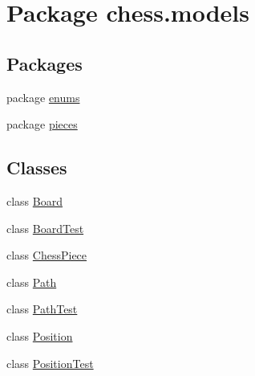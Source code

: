 \hypertarget{namespacechess_1_1models}{}\section{Package chess.\+models}
\label{namespacechess_1_1models}
\subsection*{Packages}
\begin{DoxyCompactItemize}
\item 
package \mbox{\hyperlink{namespacechess_1_1models_1_1enums}{enums}}
\item 
package \mbox{\hyperlink{namespacechess_1_1models_1_1pieces}{pieces}}
\end{DoxyCompactItemize}
\subsection*{Classes}
\begin{DoxyCompactItemize}
\item 
class \mbox{\hyperlink{classchess_1_1models_1_1_board}{Board}}
\item 
class \mbox{\hyperlink{classchess_1_1models_1_1_board_test}{Board\+Test}}
\item 
class \mbox{\hyperlink{classchess_1_1models_1_1_chess_piece}{Chess\+Piece}}
\item 
class \mbox{\hyperlink{classchess_1_1models_1_1_path}{Path}}
\item 
class \mbox{\hyperlink{classchess_1_1models_1_1_path_test}{Path\+Test}}
\item 
class \mbox{\hyperlink{classchess_1_1models_1_1_position}{Position}}
\item 
class \mbox{\hyperlink{classchess_1_1models_1_1_position_test}{Position\+Test}}
\end{DoxyCompactItemize}
